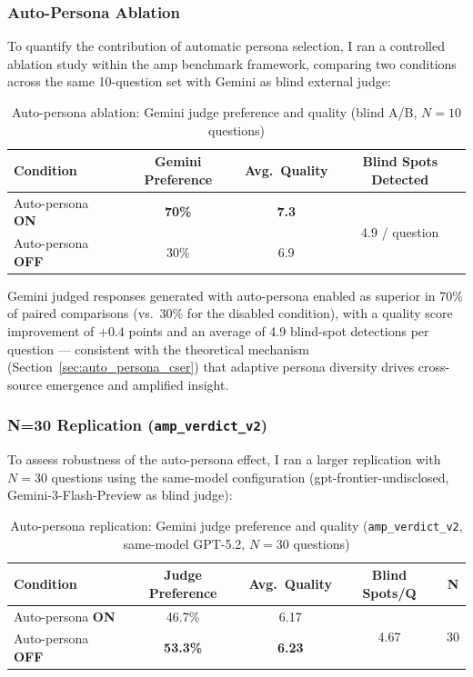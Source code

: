 \documentclass[12pt]{article}
\begin{document}
\subsubsection*{Auto-Persona Ablation}

To quantify the contribution of automatic persona selection, I ran a controlled
ablation study within the amp benchmark framework, comparing two conditions across
the same 10-question set with Gemini as blind external judge:

\begin{table}[h!]
\centering
\caption{Auto-persona ablation: Gemini judge preference and quality (blind A/B, $N=10$ questions)}
\label{tab:auto_persona_ablation}
\begin{tabular}{lccc}
\toprule
Condition & Gemini Preference & Avg.\ Quality & Blind Spots Detected \\
\midrule
Auto-persona \textbf{ON}  & \textbf{70\%} & \textbf{7.3} & \multirow{2}{*}{4.9 / question} \\
Auto-persona \textbf{OFF} & 30\%          & 6.9          & \\
\bottomrule
\end{tabular}
\end{table}

\noindent Gemini judged responses generated with auto-persona enabled as superior
in 70\% of paired comparisons (vs.\ 30\% for the disabled condition), with a
quality score improvement of $+0.4$ points and an average of 4.9 blind-spot
detections per question --- consistent with the theoretical mechanism
(Section~\ref{sec:auto_persona_cser}) that adaptive persona diversity drives
cross-source emergence and amplified insight.

\subsubsection*{N=30 Replication (\texttt{amp\_verdict\_v2})}

To assess robustness of the auto-persona effect, I ran a larger replication
with $N=30$ questions using the same-model configuration (gpt-frontier-undisclosed,
Gemini-3-Flash-Preview as blind judge):

\begin{table}[h!]
\centering
\caption{Auto-persona replication: Gemini judge preference and quality
(\texttt{amp\_verdict\_v2}, same-model GPT-5.2, $N=30$ questions)}
\label{tab:auto_persona_v2}
\begin{tabular}{lcccc}
\toprule
Condition & Judge Preference & Avg.\ Quality & Blind Spots/Q & N \\
\midrule
Auto-persona \textbf{ON}  & 46.7\% & 6.17 & \multirow{2}{*}{4.67} & \multirow{2}{*}{30} \\
Auto-persona \textbf{OFF} & \textbf{53.3\%} & \textbf{6.23} & & \\
\bottomrule
\end{tabular}
\end{table}
\end{document}
